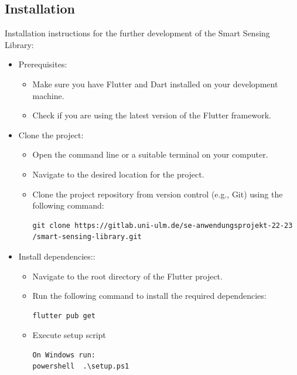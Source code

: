 \documentclass[12pt]{article}
\newcounter{fr}
\begin{document}
\subsection{Installation}
\label{ssec:demoapp}
Installation instructions for the further development of the Smart Sensing Library:
\begin{itemize}
    \item Prerequisites:
        \begin{itemize}
        \item Make sure you have Flutter and Dart installed on your development machine.
        \item Check if you are using the latest version of the Flutter framework.
        \end{itemize}
    \item Clone the project:
        \begin{itemize}
        \item Open the command line or a suitable terminal on your computer.
        \item Navigate to the desired location for the project.
        \item Clone the project repository from version control (e.g., Git) using the following command:
\begin{verbatim}
git clone https://gitlab.uni-ulm.de/se-anwendungsprojekt-22-23
/smart-sensing-library.git
\end{verbatim}
        \end{itemize}
    \item Install dependencies::
        \begin{itemize}
        \item Navigate to the root directory of the Flutter project.
        \item Run the following command to install the required dependencies:
\begin{verbatim}
flutter pub get
\end{verbatim}
        \item Execute setup script
\begin{verbatim}
On Windows run:
powershell  .\setup.ps1


\end{verbatim}
\end{itemize}
\end{itemize}
\end{document}

